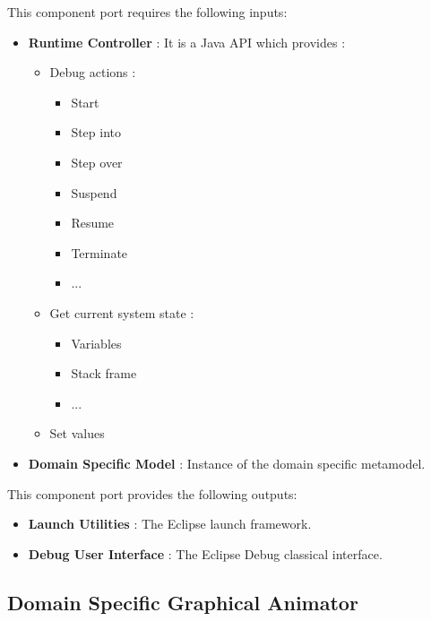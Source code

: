 \documentclass{gemoc} %
\begin{document}
This component port requires the following inputs:
\begin{itemize}
  \item \textbf{Runtime Controller} :
It is a Java API which provides :
\begin{itemize}
\item Debug actions :
\begin{itemize}
\item Start
\item Step into
\item Step over
\item Suspend
\item Resume
\item Terminate
\item ...
\end{itemize}
\item Get current system state :
\begin{itemize}
\item Variables
\item Stack frame
\item ...
\end{itemize}
\item Set values
\end{itemize}
  \item \textbf{Domain Specific Model} :
Instance of the domain specific metamodel.
\end{itemize}

This component port provides the following outputs:
\begin{itemize}
  \item \textbf{Launch Utilities} :
The Eclipse launch framework.
  \item \textbf{Debug User Interface} :
The Eclipse Debug classical interface.
\end{itemize}

\subsection{Domain Specific Graphical Animator}
\end{document}
